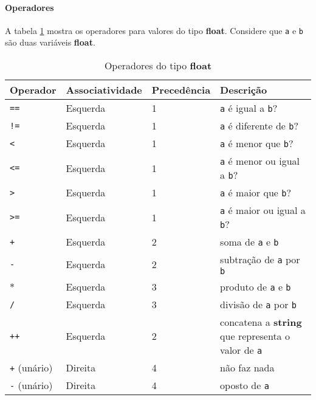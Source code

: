 \paragraph{Operadores} A tabela \ref{tab:operadores-float} mostra os operadores para valores do tipo \textbf{float}. Considere que \texttt{a} e \texttt{b} são duas variáveis \textbf{float}.
\begin{table}[!h]
    \begin{tabular}{@{}llll@{}}
        \toprule
        Operador                 & Associatividade & Precedência & Descrição                                 \\ \midrule
        \texttt{==}              & Esquerda        & 1           & \texttt{a} é igual a \texttt{b}?          \\
        \texttt{!=}              & Esquerda        & 1           & \texttt{a} é diferente de \texttt{b}?     \\
        \texttt{\textless{}}     & Esquerda        & 1           & \texttt{a} é menor que \texttt{b}?        \\
        \texttt{\textless{}=}    & Esquerda        & 1           & \texttt{a} é menor ou igual a \texttt{b}? \\
        \texttt{\textgreater{}}  & Esquerda        & 1           & \texttt{a} é maior que \texttt{b}?        \\
        \texttt{\textgreater{}=} & Esquerda        & 1           & \texttt{a} é maior ou igual a \texttt{b}? \\
        \texttt{+}               & Esquerda        & 2           & soma de \texttt{a} e \texttt{b}           \\
        \texttt{-}               & Esquerda        & 2           & subtração de \texttt{a} por \texttt{b}    \\
        \texttt{$*$}             & Esquerda        & 3           & produto de \texttt{a} e \texttt{b}        \\
        \texttt{/}               & Esquerda        & 3           & divisão de \texttt{a} por \texttt{b}      \\
        \texttt{++}              & Esquerda        & 2           & concatena a \textbf{string} que representa o valor de \texttt{a}\\
        \texttt{+} (unário)      & Direita         & 4           & não faz nada                                                      \\
        \texttt{-} (unário)      & Direita         & 4           & oposto de \texttt{a}
    \end{tabular}
    \caption{Operadores do tipo \textbf{float}}
    \label{tab:operadores-float}
\end{table}

